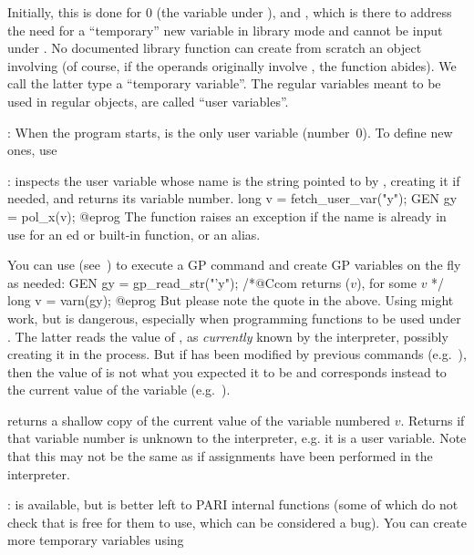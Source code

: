 Initially, this is done for $0$ (the variable  under ), and
, which is there to address the need for a ``temporary'' new
variable in library mode and cannot be input under . No documented
library function can create from scratch an object involving 
(of course, if the operands originally involve , the function
abides). We call the latter type a ``temporary variable''. The regular
variables meant to be used in regular objects, are called ``user
variables''.

: When the program starts,
 is the only user variable (number~$0$). To define new ones, use

: inspects the user variable whose name is
the string pointed to by , creating it if needed, and returns its
variable number.
\bprog
long v = fetch_user_var("y");
GEN gy = pol_x(v);
@eprog\noindent
The function raises an exception if the name is already in use for an
ed or built-in function, or an alias.

 You can use 
(see~) to execute a GP command and create GP
variables on the fly as needed:
\bprog
GEN gy = gp_read_str("'y"); /*@Ccom returns ($v$), for some $v$ */
long v = varn(gy);
@eprog\noindent
But please note the quote  in the above. Using 
might work, but is dangerous, especially when programming functions to
be used under . The latter reads the value of , as
\emph{currently} known by the  interpreter, possibly creating it
in the process. But if  has been modified by previous 
commands (e.g.~), then the value of  is not what you
expected it to be and corresponds instead to the current value of the
 variable (e.g.~).

 returns a shallow copy of the current
value of the variable numbered $v$. Returns  if that variable
number is unknown to the interpreter,  e.g. it is a user variable. Note
that this may not be the same as  if assignments have been
performed in the interpreter.

:
 is available, but is better left to PARI internal functions
(some of which do not check that  is free for them to use,
which can be considered a bug). You can create more temporary variables
using

